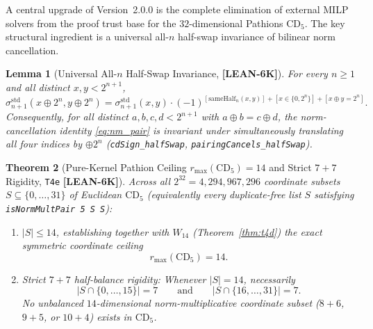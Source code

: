 \documentclass[11pt,reqno]{amsart}
\newcommand{\code}[1]{\textnormal{\texttt{\small\nolinkurl{#1}}}}
\newcommand{\cmd}[1]{\textnormal{\texttt{\small #1}}}
\theoremstyle{plain}
\newtheorem{theorem}{Theorem}[section]
\newtheorem{lemma}[theorem]{Lemma}
\theoremstyle{definition}
\theoremstyle{remark}
\newcommand{\tagLean}{\mbox{\textsf{\textbf{\color{oiBlue}[LEAN-6K]}}}}
\newcommand{\CD}{\mathrm{CD}}
\newcommand{\std}{\mathrm{std}}
\begin{document}
A central upgrade of Version~2.0.0 is the complete elimination of external MILP solvers from the
proof trust base for the $32$-dimensional Pathions $\CD_5$. The key structural ingredient is a
universal all-$n$ half-swap invariance of bilinear norm cancellation.

\begin{lemma}[Universal All-$n$ Half-Swap Invariance, \tagLean]
\label{lem:halfswap}
For every $n \ge 1$ and all distinct $x, y < 2^{n+1}$,
\[
  \sigma_{n+1}^{\std}(x \oplus 2^n, y \oplus 2^n)
  = \sigma_{n+1}^{\std}(x, y) \cdot
    (-1)^{[\mathrm{sameHalf}_n(x,y)] + [x \in \{0, 2^n\}] + [x \oplus y = 2^n]}.
\]
Consequently, for all distinct $a, b, c, d < 2^{n+1}$ with $a \oplus b = c \oplus d$, the
norm-cancellation identity \eqref{eq:nm_pair} is invariant under simultaneously translating all
four indices by $\oplus 2^n$ (\code{cdSign_halfSwap}, \code{pairingCancels_halfSwap}).
\end{lemma}

\begin{theorem}[Pure-Kernel Pathion Ceiling $r_{\max}(\CD_5) = 14$ and Strict $7+7$ Rigidity, \texttt{T4e} \tagLean]
\label{thm:t4e}
Across \emph{all} $2^{32} = 4{,}294{,}967{,}296$ coordinate subsets $S \subseteq \{0, \dots, 31\}$
of Euclidean $\CD_5$ (equivalently every duplicate-free list $S$ satisfying \cmd{isNormMultPair 5 S S}):
\begin{enumerate}[leftmargin=2em]
  \item $|S| \le 14$, establishing together with $W_{14}$ (Theorem~\ref{thm:t4d}) the exact
    symmetric coordinate ceiling
    \begin{equation}
      r_{\max}(\CD_5) = 14.
    \end{equation}
  \item \emph{Strict $7 + 7$ half-balance rigidity:} Whenever $|S| = 14$, necessarily
    \begin{equation}
      |S \cap \{0, \dots, 15\}| = 7 \qquad \text{and} \qquad |S \cap \{16, \dots, 31\}| = 7.
    \end{equation}
    No unbalanced $14$-dimensional norm-multiplicative coordinate subset ($8+6$, $9+5$, or $10+4$)
    exists in $\CD_5$.
\end{enumerate}
\end{theorem}
\end{document}
